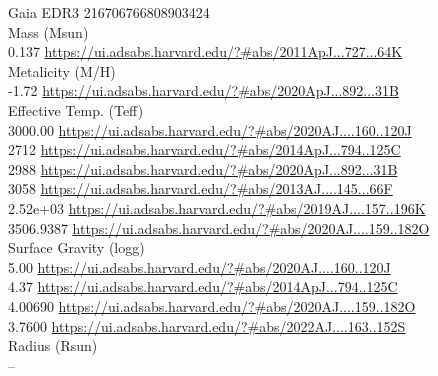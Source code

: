 Gaia EDR3 216706766808903424\\
Mass (Msun)\\
0.137 \url{https://ui.adsabs.harvard.edu/?#abs/2011ApJ...727...64K}\\
Metalicity (M/H)\\
-1.72 \url{https://ui.adsabs.harvard.edu/?#abs/2020ApJ...892...31B}\\
Effective Temp. (Teff)\\
3000.00 \url{https://ui.adsabs.harvard.edu/?#abs/2020AJ....160..120J}\\
2712 \url{https://ui.adsabs.harvard.edu/?#abs/2014ApJ...794..125C}\\
2988 \url{https://ui.adsabs.harvard.edu/?#abs/2020ApJ...892...31B}\\
3058 \url{https://ui.adsabs.harvard.edu/?#abs/2013AJ....145...66F}\\
2.52e+03 \url{https://ui.adsabs.harvard.edu/?#abs/2019AJ....157..196K}\\
3506.9387 \url{https://ui.adsabs.harvard.edu/?#abs/2020AJ....159..182O}\\
Surface Gravity (logg)\\
5.00 \url{https://ui.adsabs.harvard.edu/?#abs/2020AJ....160..120J}\\
4.37 \url{https://ui.adsabs.harvard.edu/?#abs/2014ApJ...794..125C}\\
4.00690 \url{https://ui.adsabs.harvard.edu/?#abs/2020AJ....159..182O}\\
3.7600 \url{https://ui.adsabs.harvard.edu/?#abs/2022AJ....163..152S}\\
Radius (Rsun)\\
--\